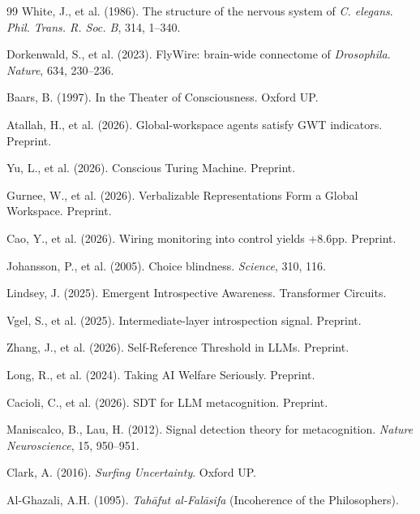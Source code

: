 \documentclass[11pt]{article}
\begin{document}
\begin{thebibliography}{99}
White, J., et al. (1986). The structure of the nervous system of \emph{C. elegans}. \emph{Phil. Trans. R. Soc. B}, 314, 1--340.

Dorkenwald, S., et al. (2023). FlyWire: brain-wide connectome of \emph{Drosophila}. \emph{Nature}, 634, 230--236.

Baars, B. (1997). In the Theater of Consciousness. Oxford UP.

Atallah, H., et al. (2026). Global-workspace agents satisfy GWT indicators. Preprint.

Yu, L., et al. (2026). Conscious Turing Machine. Preprint.

Gurnee, W., et al. (2026). Verbalizable Representations Form a Global Workspace. Preprint.

Cao, Y., et al. (2026). Wiring monitoring into control yields +8.6pp. Preprint.

Johansson, P., et al. (2005). Choice blindness. \emph{Science}, 310, 116.

Lindsey, J. (2025). Emergent Introspective Awareness. Transformer Circuits.

Vgel, S., et al. (2025). Intermediate-layer introspection signal. Preprint.

Zhang, J., et al. (2026). Self-Reference Threshold in LLMs. Preprint.

Long, R., et al. (2024). Taking AI Welfare Seriously. Preprint.

Cacioli, C., et al. (2026). SDT for LLM metacognition. Preprint.

Maniscalco, B., Lau, H. (2012). Signal detection theory for metacognition. \emph{Nature Neuroscience}, 15, 950--951.

Clark, A. (2016). \emph{Surfing Uncertainty}. Oxford UP.

Al-Ghazali, A.H. (1095). \emph{Tah\=afut al-Fal\=asifa} (Incoherence of the Philosophers).


\end{thebibliography}
\end{document}

